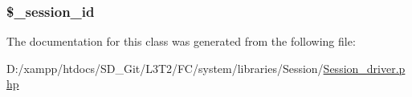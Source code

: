 \subsubsection[{\$\+\_\+session\+\_\+id}]{\setlength{\rightskip}{0pt plus 5cm}\$\+\_\+session\+\_\+id\hspace{0.3cm}{\ttfamily [protected]}}\label{class_c_i___session__driver_a92023c94926d17b1f6705c8b1d35a103}


The documentation for this class was generated from the following file\+:\begin{DoxyCompactItemize}
\item 
D\+:/xampp/htdocs/\+S\+D\+\_\+\+Git/\+L3\+T2/\+F\+C/system/libraries/\+Session/\hyperlink{_session__driver_8php}{Session\+\_\+driver.\+php}\end{DoxyCompactItemize}
